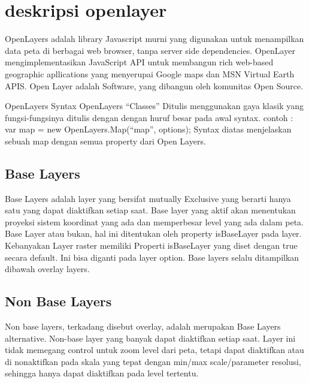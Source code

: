 
\section{deskripsi openlayer}
  OpenLayers adalah library Javascript murni yang digunakan untuk menampilkan data peta di berbagai web browser, tanpa server side dependencies.
  OpenLayer mengimplementasikan JavaScript API untuk membangun rich web-based geographic apllications yang menyerupai Google maps dan MSN Virtual Earth APIS.
  Open Layer adalah Software, yang dibangun oleh komunitas Open Source.
  
  OpenLayers Syntax
  OpenLayers “Classes”
  Ditulis menggunakan gaya klasik yang fungsi-fungsinya ditulis dengan dengan huruf besar pada awal syntax.
  contoh : var map = new OpenLayers.Map(“map”, options);
  Syntax diatas menjelaskan sebuah map dengan semua property dari Open Layers. 
  
\subsection{Base Layers}
 Base Layers adalah layer yang bersifat mutually Exclusive yang berarti hanya satu yang dapat diaktifkan setiap saat. Base layer yang aktif akan menentukan proyeksi sistem koordinat yang ada dan memperbesar level yang ada dalam peta. Base Layer atau bukan, hal ini ditentukan oleh property isBaseLayer pada layer. Kebanyakan Layer raster memiliki Properti isBaseLayer yang diset dengan true secara default. Ini bisa diganti pada layer option. Base layers selalu ditampilkan dibawah overlay layers.

\subsection{Non Base Layers}
Non base layers, terkadang disebut overlay, adalah merupakan Base Layers alternative. Non-base layer yang banyak dapat diaktifkan setiap saat. Layer ini tidak memegang control untuk zoom level dari peta, tetapi dapat diaktifkan atau di nonaktifkan pada skala yang tepat dengan min/max scale/parameter resolusi, sehingga hanya dapat diaktifkan pada level tertentu.


